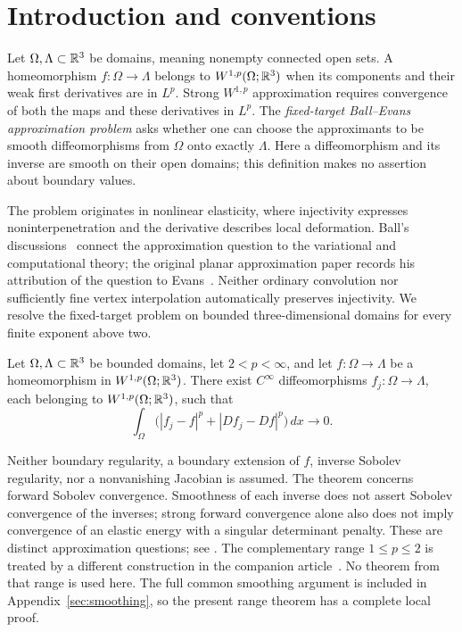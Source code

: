 \section{Introduction and conventions}\label{sec:introduction}

Let $\Omega,\Lambda\subset\mathbb R^3$ be domains, meaning nonempty connected
open sets.  A homeomorphism $f:\Omega\to\Lambda$ belongs to
$W^{1,p}(\Omega;\mathbb R^3)$ when its components and their weak first
derivatives are in $L^p$.  Strong $W^{1,p}$ approximation requires
convergence of both the maps and these derivatives in $L^p$.
The \emph{fixed-target Ball--Evans approximation problem} asks whether
one can choose the approximants to be smooth diffeomorphisms from
$\Omega$ onto exactly $\Lambda$.  Here a diffeomorphism and its inverse
are smooth on their open domains; this definition makes no assertion
about boundary values.

The problem originates in nonlinear elasticity, where injectivity
expresses noninterpenetration and the derivative describes local
deformation.  Ball's discussions~\cite{Ball2001,Ball2002,Ball2010}
connect the approximation question to the variational and computational
theory; the original planar approximation paper records his attribution
of the question to Evans~\cite{IwaniecKovalevOnninen2011}.
Neither ordinary convolution nor sufficiently fine vertex interpolation
automatically preserves injectivity.  We resolve the fixed-target
problem on bounded three-dimensional domains for every finite exponent
above two.

\begin{theorem}\label{main:theorem}\label{ha:approximation}
Let $\Omega,\Lambda\subset\mathbb R^3$ be bounded domains, let $2<p<\infty$,
and let $f:\Omega\to\Lambda$ be a homeomorphism in
$W^{1,p}(\Omega;\mathbb R^3)$. There exist $C^\infty$ diffeomorphisms
$f_j:\Omega\to\Lambda$, each belonging to
$W^{1,p}(\Omega;\mathbb R^3)$, such that
\begin{equation}\label{main:convergence}
\int_\Omega\bigl( |f_j-f|^p+|Df_j-Df|^p\bigr)\,dx\longrightarrow0.
\end{equation}
\end{theorem}

Neither boundary regularity, a boundary extension of $f$, inverse
Sobolev regularity, nor a nonvanishing Jacobian is assumed.  The
theorem concerns forward Sobolev convergence.  Smoothness of each
inverse does not assert Sobolev convergence of the inverses; strong
forward convergence alone also does not imply convergence of an elastic
energy with a singular determinant penalty.  These are distinct
approximation questions; see \cite{Ball2002,Pratelli2017,Hencl2025}.
The complementary range $1\le p\le2$ is treated by a different
construction in the companion article~\cite{OpenAILow2026}.
No theorem from that range is used here.  The full common smoothing
argument is included in Appendix~\ref{sec:smoothing}, so the present
range theorem has a complete local proof.

